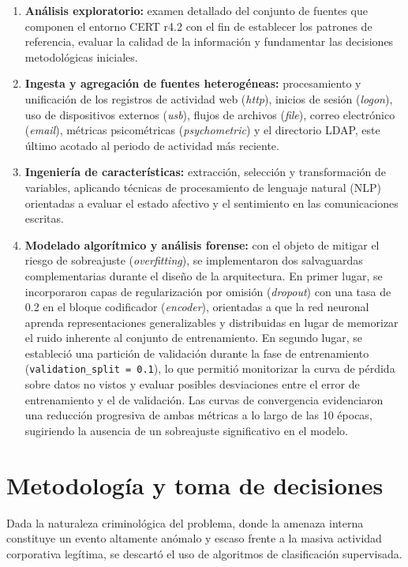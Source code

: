 \documentclass[IB]{TFUOC}%
\begin{document}
    \begin{enumerate}
        \item \textbf{Análisis exploratorio:} examen detallado del conjunto de fuentes que componen el entorno CERT r4.2 con el fin de establecer los patrones de referencia, evaluar la calidad de la información y fundamentar las decisiones metodológicas iniciales.
        
        \item \textbf{Ingesta y agregación de fuentes heterogéneas:} procesamiento y unificación de los registros de actividad web (\textit{http}), inicios de sesión (\textit{logon}), uso de dispositivos externos (\textit{usb}), flujos de archivos (\textit{file}), correo electrónico (\textit{email}), métricas psicométricas (\textit{psychometric}) y el directorio LDAP, este último acotado al periodo de actividad más reciente.
        
        \item \textbf{Ingeniería de características:} extracción, selección y transformación de variables, aplicando técnicas de procesamiento de lenguaje natural (NLP) orientadas a evaluar el estado afectivo y el sentimiento en las comunicaciones escritas.
        
        \item \textbf{Modelado algorítmico y análisis forense:} con el objeto de mitigar el riesgo de sobreajuste (\textit{overfitting}), se implementaron dos salvaguardas complementarias durante el diseño de la arquitectura. En primer lugar, se incorporaron capas de regularización por omisión (\textit{dropout}) con una tasa de 0.2 en el bloque codificador (\textit{encoder}), orientadas a que la red neuronal aprenda representaciones generalizables y distribuidas en lugar de memorizar el ruido inherente al conjunto de entrenamiento. En segundo lugar, se estableció una partición de validación durante la fase de entrenamiento (\texttt{validation\_split = 0.1}), lo que permitió monitorizar la curva de pérdida sobre datos no vistos y evaluar posibles desviaciones entre el error de entrenamiento y el de validación. Las curvas de convergencia evidenciaron una reducción progresiva de ambas métricas a lo largo de las 10 épocas, sugiriendo la ausencia de un sobreajuste significativo en el modelo.
    \end{enumerate}
    
\section{Metodología y toma de decisiones}
Dada la naturaleza criminológica del problema, donde la amenaza interna constituye un evento altamente anómalo y escaso frente a la masiva actividad corporativa legítima, se descartó el uso de algoritmos de clasificación supervisada.
\end{document}
